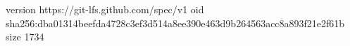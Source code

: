 version https://git-lfs.github.com/spec/v1
oid sha256:dba01314beefda4728c3ef3d514a8ee390e463d9b264563acc8a893f21e2f61b
size 1734
